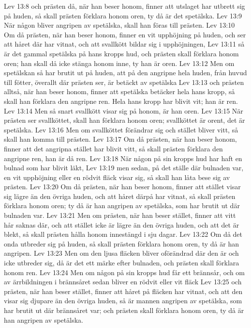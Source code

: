 Lev 13:8  och prästen då, när han beser honom, finner att utslaget har utbrett sig på huden, så skall prästen förklara honom oren, ty då är det spetälska.
Lev 13:9  När någon bliver angripen av spetälska, skall han föras till prästen.
Lev 13:10  Om då prästen, när han beser honom, finner en vit upphöjning på huden, och ser att håret där har vitnat, och att svallkött bildar sig i upphöjningen,
Lev 13:11  så är det gammal spetälska på hans kropps hud, och prästen skall förklara honom oren; han skall då icke stänga honom inne, ty han är oren.
Lev 13:12  Men om spetälskan så har brutit ut på huden, att på den angripne hela huden, från huvud till fötter, överallt där prästen ser, är betäckt av spetälska
Lev 13:13  och prästen alltså, när han beser honom, finner att spetälska betäcker hela hans kropp, så skall han förklara den angripne ren. Hela hans kropp har blivit vit; han är ren.
Lev 13:14  Men så snart svallkött visar sig på honom, är han oren.
Lev 13:15  När prästen ser svallköttet, skall han förklara honom oren; svallköttet är orent, det är spetälska.
Lev 13:16  Men om svallköttet förändrar sig och stället bliver vitt, så skall han komma till prästen.
Lev 13:17  Om då prästen, när han beser honom, finner att det angripna stället har blivit vitt, så skall prästen förklara den angripne ren, han är då ren.
Lev 13:18  När någon på sin kropps hud har haft en bulnad som har blivit läkt,
Lev 13:19  men sedan, på det ställe där bulnaden var, en vit upphöjning eller en rödvit fläck visar sig, så skall han låta bese sig av prästen.
Lev 13:20  Om då prästen, när han beser honom, finner att stället visar sig lägre än den övriga huden, och att håret därpå har vitnat, så skall prästen förklara honom oren; ty då är han angripen av spetälska, som har brutit ut där bulnaden var.
Lev 13:21  Men om prästen, när han beser stället, finner att vitt hår saknas där, och att stället icke är lägre än den övriga huden, och att det är blekt, så skall prästen hålla honom innestängd i sju dagar.
Lev 13:22  Om då det onda utbreder sig på huden, så skall prästen förklara honom oren, ty då är han angripen.
Lev 13:23  Men om den ljusa fläcken bliver oförändrad där den är och icke utbreder sig, då är det ett märke efter bulnaden, och prästen skall förklara honom ren.
Lev 13:24  Men om någon på sin kropps hud får ett brännsår, och om av ärrbildningen i brännsåret sedan bliver en rödvit eller vit fläck
Lev 13:25  och prästen, när han beser stället, finner att håret på fläcken har vitnat, och att den visar sig djupare än den övriga huden, så är mannen angripen av spetälska, som har brutit ut där brännsåret var; och prästen skall förklara honom oren, ty då är han angripen av spetälska.
